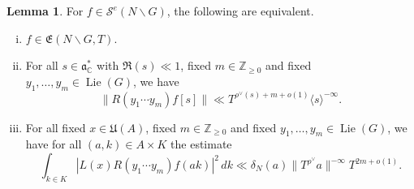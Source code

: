 \documentclass[reqno]{amsart}
\DeclareMathOperator{\Lie}{Lie}
\theoremstyle{plain} \newtheorem{theorem} {Theorem}
\theoremstyle{definition} \newtheorem{definition} [theorem] {Definition}
\theoremstyle{itplain} %
\newtheorem{lemma}[theorem]{Lemma}
\numberwithin{equation}{section}
\numberwithin{theorem}{section}
\renewcommand{\geq}{\geqslant}
\begin{document}
\begin{lemma}\label{lem:standard:frakE-equivalences}
  For $f \in \mathcal{S}^e(N \backslash G)$, the following are equivalent.
  \begin{enumerate}[(i)]
  \item \label{itm:lemma-class-frak-E-basic:1} $f \in \mathfrak{E}(N \backslash G, T)$.
  \item \label{itm:lemma-class-frak-E-basic:2}  For all $s \in \mathfrak{a}_{\mathbb{C}}^*$ with $\Re(s) \ll 1$, fixed $m \in \mathbb{Z}_{\geq 0}$ and fixed $y_1,\dotsc,y_m \in \Lie(G)$, we have
  \begin{equation}\label{eq:x_1-dotsb-x_m}
    \|R(y_1 \dotsb y_m) f[s]\| \ll T^{\rho^\vee(s) + m + o(1)} \langle s \rangle^{-\infty}.
  \end{equation}
\item \label{itm:lemma-class-frak-E-basic:3} For all fixed $x \in \mathfrak{U}(A)$, fixed $m \in \mathbb{Z}_{\geq 0}$ and fixed $y_1,\dotsc,y_m \in \Lie(G)$, we have for all $(a,k) \in A \times K$ the estimate
  \begin{equation}\label{eq:int-_k-in}
    \int _{k \in K}
    \left\lvert
      L(x) R(y_1 \dotsb y_m) f(a k)
    \right\rvert^2 \, d k
    \ll
    \delta_N(a)
    \|T^{\rho^\vee} a\|^{-\infty}
    T^{2 m + o(1)}.
  \end{equation}
  \end{enumerate}
\end{lemma}
\end{document}
